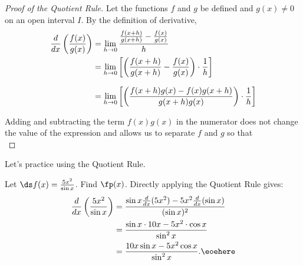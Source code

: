 \begin{proof}[Proof of the Quotient Rule]
Let the functions $f$ and $g$ be defined and $g(x) \neq 0$ on an open interval $I$. By the definition of derivative,
\begin{align*}
\frac{d}{dx}\left(\frac {f(x)}{g(x)}\right)
&=\lim_{h\to 0}\frac{\frac{f(x+h)}{g(x+h)}-\frac{f(x)}{g(x)}}{h} \\
&=\lim_{h\to 0}
\left[\left(\frac{f(x+h)}{g(x+h)}-\frac{f(x)}{g(x)}\right)\cdot\frac1h\right]\\[.5\baselineskip]
&=\lim_{h\to 0}
\left[\left(\frac{f(x+h)g(x)-f(x)g(x+h)}{g(x+h)g(x)}\right)\cdot\frac1h\right]
\end{align*}

Adding and subtracting the term $f(x)g(x)$ in the numerator does not change the value of the expression and allows us to separate $f$ and $g$ so that\\
\end{proof}

Let's practice using the Quotient Rule.

\begin{example}\label{ex_quot1}
Let $\ds f(x) = \frac{5x^2}{\sin x}$. Find $\fp(x)$.
\solution
Directly applying the Quotient Rule gives:
\begin{align*}
	\frac{d}{dx}\left(\frac{5x^2}{\sin x}\right)
	& = \frac{\sin x\frac{d}{dx}(5x^2)-5x^2\frac{d}{dx}(\sin x)}{(\sin x)^2} \\
	&= \frac{\sin x\cdot 10x - 5x^2\cdot \cos x}{\sin^2x} \\
	&= \frac{10x\sin x - 5x^2\cos x}{\sin^2 x}.\eoehere
\end{align*}
\end{example}

